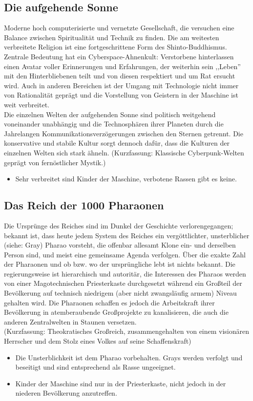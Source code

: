 \documentclass[10pt,a4paper]{report}
\begin{document}
\subsection*{Die aufgehende Sonne}
Moderne hoch computerisierte und vernetzte Gesellschaft, die versuchen eine Balance zwischen Spiritualität und Technik zu finden. Die am weitesten verbreitete Religion ist eine fortgeschrittene Form des Shinto-Buddhismus. Zentrale Bedeutung hat ein Cyberspace-Ahnenkult: Verstorbene hinterlassen einen Avatar voller Erinnerungen und Erfahrungen, der weiterhin sein ,,Leben'' mit den Hinterbliebenen teilt und von diesen respektiert und um Rat ersucht wird. Auch in anderen Bereichen ist der Umgang mit Technologie nicht immer von Rationalität geprägt und die Vorstellung von Geistern in der Maschine ist weit verbreitet.\\

Die einzelnen Welten der aufgehenden Sonne sind politisch weitgehend voneinander unabhängig und die Technosphären ihrer Planeten durch die Jahrelangen Kommunikationsverzögerungen zwischen den Sternen getrennt. Die konservative und stabile Kultur sorgt dennoch dafür, dass die Kulturen der einzelnen Welten sich stark ähneln.
(Kurzfassung: Klassische Cyberpunk-Welten geprägt von fernöstlicher Mystik.)
\begin{itemize}
\item Sehr verbreitet sind Kinder der Maschine, verbotene Rassen gibt es keine.
\end{itemize}

\subsection*{Das Reich der 1000 Pharaonen}
Die Ursprünge des Reiches sind im Dunkel der Geschichte verlorengegangen; bekannt ist, dass heute jedem System des Reiches ein vergöttlichter, unsterblicher (siehe: Gray) Pharao vorsteht, die offenbar allesamt Klone ein- und derselben Person sind, und meist eine gemeinsame Agenda verfolgen. Über die exakte Zahl der Pharaonen und ob bzw. wo der ursprüngliche lebt ist nichts bekannt. Die regierungsweise ist hierarchisch und autoritär, die Interessen des Pharaos werden von einer Magotechnischen Priesterkaste durchgesetzt während ein Großteil der Bevölkerung auf technisch niedrigem (aber nicht zwangsläufig armem) Niveau gehalten wird. Die Pharaonen schaffen es jedoch die Arbeitskraft ihrer Bevölkerung in atemberaubende Großprojekte zu kanalisieren, die auch die anderen Zentralwelten in Staunen versetzen.\\
(Kurzfassung: Theokratisches Großreich, zusammengehalten von einem visionären Herrscher und dem Stolz eines Volkes auf seine Schaffenskraft)
\begin{itemize}
\item Die Unsterblichkeit ist dem Pharao vorbehalten. Grays werden verfolgt und beseitigt und sind entsprechend als Rasse ungeeignet.
\item Kinder der Maschine sind nur in der Priesterkaste, nicht jedoch in der niederen Bevölkerung anzutreffen. 
\end{itemize}
\end{document}
